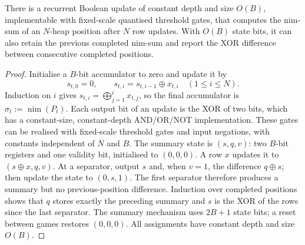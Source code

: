 \documentclass[twoside,11pt]{article}
\numberwithin{theorem}{section}
\numberwithin{equation}{section}
\begin{document}
\begin{proposition}
\label{prop:streaming-nimsum}
There is a recurrent Boolean update of constant depth and size $O(B)$, implementable with fixed-scale quantised threshold gates, that computes the nim-sum of an $N$-heap position after $N$ row updates. With $O(B)$ state bits, it can also retain the previous completed nim-sum and report the XOR difference between consecutive completed positions.
\end{proposition}
\begin{proof}
Initialise a $B$-bit accumulator to zero and update it by
\[
s_{t,0}=0,\qquad s_{t,i}=s_{t,i-1}\oplus x_{t,i}\quad (1\le i\le N).
\]
Induction on $i$ gives $s_{t,i}=\bigoplus_{j=1}^{i}x_{t,j}$, so the final accumulator is $\sigma_t:=\operatorname{nim}(P_t)$.
Each output bit of an update is the XOR of two bits, which has a constant-size, constant-depth AND/OR/NOT implementation. These gates can be realised with fixed-scale threshold gates and input negations, with constants independent of $N$ and $B$.
The summary state is $(s,q,v)$: two $B$-bit registers and one validity bit, initialised to $(0,0,0)$. A row $x$ updates it to $(s\oplus x,q,v)$. At a separator, output $s$ and, when $v=1$, the difference $q\oplus s$; then update the state to $(0,s,1)$. The first separator therefore produces a summary but no previous-position difference. Induction over completed positions shows that $q$ stores exactly the preceding summary and $s$ is the XOR of the rows since the last separator. The summary mechanism uses $2B+1$ state bits; a reset between games restores $(0,0,0)$. All assignments have constant depth and size $O(B)$.
\end{proof}
\end{document}
